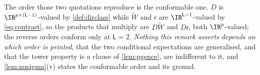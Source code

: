 \begin{remark}
The order those two quotations reproduce is the conformable one. $D$ is
$\IR^{p\times(\mathsf L-1)}$-valued by \cref{def:dirclass} while $\widetilde W$ and $\mathsf r$ are
$\IR^{\mathsf L-1}$-valued by \eqref{eq:contrast}, so the products that multiply are $D\widetilde W$ and
$D\mathsf r$, both $\IR^{p}$-valued; the reverse orders conform only at $\mathsf L=2$.
\emph{Nothing this remark asserts depends on which order is printed}, that the two conditional
expectations are generalised, and that the tower property is a clause of \cref{lem:pgence}, are
indifferent to it, and \cref{lem:nusigma}\textup{(v)} states the conformable order and its ground.
%
%
\end{remark}

